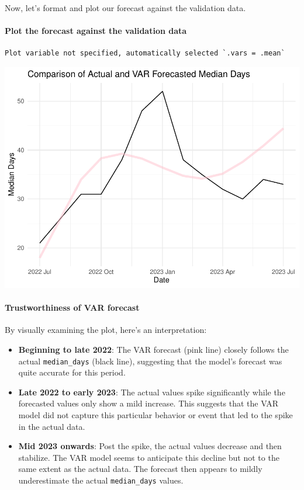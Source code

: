\documentclass[
]{article}
\begin{document}
Now, let's format and plot our forecast against the validation data.

\hypertarget{plot-the-forecast-against-the-validation-data}{%
\paragraph{Plot the forecast against the validation
data}\label{plot-the-forecast-against-the-validation-data}}

\begin{verbatim}
Plot variable not specified, automatically selected `.vars = .mean`
\end{verbatim}

\includegraphics{Montgomery_Rachel_Assignment6_files/figure-latex/unnamed-chunk-10-1.pdf}

\hypertarget{trustworthiness-of-var-forecast}{%
\paragraph{Trustworthiness of VAR
forecast}\label{trustworthiness-of-var-forecast}}

By visually examining the plot, here's an interpretation:

\begin{itemize}
\item
  \textbf{Beginning to late 2022}: The VAR forecast (pink line) closely
  follows the actual \texttt{median\_days} (black line), suggesting that
  the model's forecast was quite accurate for this period.
\item
  \textbf{Late 2022 to early 2023}: The actual values spike
  significantly while the forecasted values only show a mild increase.
  This suggests that the VAR model did not capture this particular
  behavior or event that led to the spike in the actual data.
\item
  \textbf{Mid 2023 onwards}: Post the spike, the actual values decrease
  and then stabilize. The VAR model seems to anticipate this decline but
  not to the same extent as the actual data. The forecast then appears
  to mildly underestimate the actual \texttt{median\_days} values.
\end{itemize}
\end{document}
